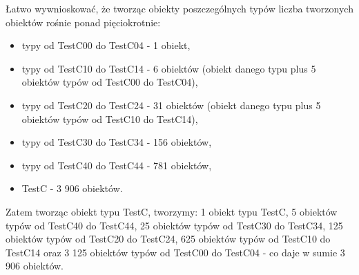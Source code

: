 \documentclass[12pt]{article}
\begin{document}
Łatwo wywnioskować, że tworząc obiekty poszczególnych typów liczba tworzonych obiektów rośnie ponad pięciokrotnie:
\begin{itemize}
	\item typy od TestC00 do TestC04 - 1 obiekt,
	\item typy od TestC10 do TestC14 - 6 obiektów (obiekt danego typu plus 5 obiektów typów od TestC00 do TestC04),
	\item typy od TestC20 do TestC24 - 31 obiektów (obiekt danego typu plus 5 obiektów typów od TestC10 do TestC14),
	\item typy od TestC30 do TestC34 - 156 obiektów,
	\item  typy od TestC40 do TestC44 - 781 obiektów,
	\item TestC - 3 906 obiektów.
\end{itemize}
Zatem tworząc obiekt typu TestC, tworzymy: 1 obiekt typu TestC, 5 obiektów typów od TestC40 do TestC44, 25 obiektów typów od TestC30 do TestC34, 125 obiektów typów od TestC20 do TestC24, 625 obiektów typów od TestC10 do TestC14 oraz 3 125 obiektów typów od TestC00 do TestC04 - co daje w sumie 3 906 obiektów.
\end{document}
